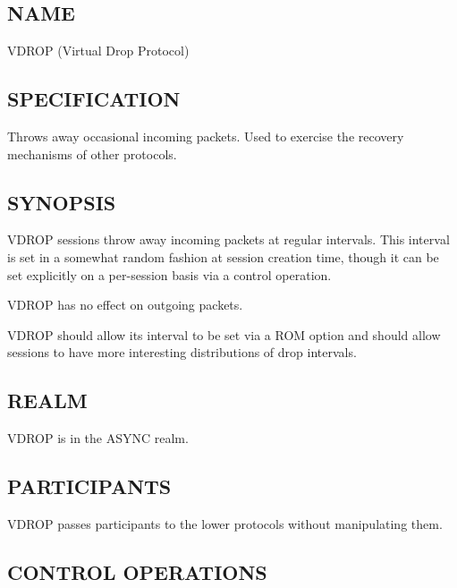 %     
%
%
%
%
%

\subsection*{NAME}

\noindent VDROP (Virtual Drop Protocol)

\subsection*{SPECIFICATION}

\noindent 
Throws away occasional incoming packets.  Used to exercise the
recovery mechanisms of other protocols.

\subsection*{SYNOPSIS}

\noindent 
VDROP sessions throw away incoming packets at regular intervals.  This
interval is set in a somewhat random fashion at session creation time,
though it can be set explicitly on a per-session basis via a control
operation. 

VDROP has no effect on outgoing packets.

VDROP should allow its interval to be set via a ROM option and should
allow sessions to have more interesting distributions of drop
intervals.

 
\subsection*{REALM}

VDROP is in the ASYNC realm.

\subsection*{PARTICIPANTS}

VDROP passes participants to the lower protocols without manipulating
them. 

\subsection*{CONTROL OPERATIONS}

